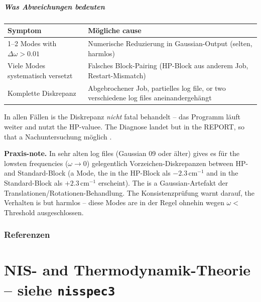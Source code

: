 \documentclass[11pt,a4paper,twoside]{article}
\theoremstyle{remark}
\begin{document}
\subsubsection*{Was Abweichungen bedeuten}

\begin{center}
\begin{tabularx}{\textwidth}{l X}
\toprule
\textbf{Symptom} & \textbf{M\"ogliche cause} \\
\midrule
1--2 Modes with $\Delta\omega > 0.01$ &
  Numerische Reduzierung in Gaussian-Output (selten, harmlos) \\
Viele Modes systematisch versetzt &
  Falsches Block-Pairing (HP-Block aus anderem Job, Restart-Mismatch) \\
Komplette Diskrepanz &
  Abgebrochener Job, partielles log file, or two verschiedene
  log files aneinandergeh\"angt \\
\bottomrule
\end{tabularx}
\end{center}

In allen F\"allen is the Diskrepanz \emph{nicht} fatal behandelt --
das Programm l\"auft weiter and nutzt the HP-valuee. The Diagnose
landet but in the REPORT, so that a Nachuntersuchung m\"oglich .

\begin{warnbox}
\textbf{Praxis-note.} In sehr alten log files (Gaussian 09 oder
\"alter) gives es f\"ur the lowsten frequencies ($\omega \to 0$)
gelegentlich Vorzeichen-Diskrepanzen between HP- and Standard-Block
(a Mode, the in the HP-Block als $-2.3$\,cm$^{-1}$ and in the Standard-Block
als $+2.3$\,cm$^{-1}$ erscheint). The is a Gaussian-Artefakt der
Translationen/Rotationen-Behandlung. The Konsistenzpr\"ufung warnt
darauf, the Verhalten is but harmlos -- diese Modes are in der
Regel ohnehin wegen $\omega < $ Threshold ausgeschlossen.
\end{warnbox}


\clearpage
\section*{Referenzen}

\part{NIS- and Thermodynamik-Theorie -- siehe \texttt{nisspec3}}
\label{part:nis-theorie}
\end{document}
